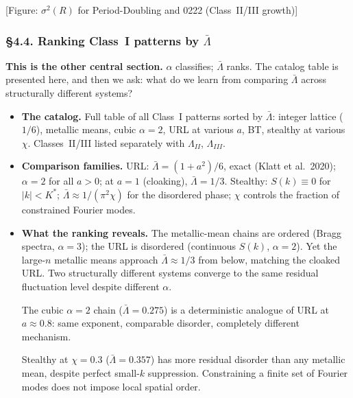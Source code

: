 \documentclass[11pt]{article}
\newcommand{\fig}[1]{{\color{figcolor}\textsf{[Figure: #1]}}}
\newcommand{\Lb}{\bar\Lambda}
\begin{document}
\fig{$\sigma^2(R)$ for Period-Doubling and 0222 (Class~II/III growth)}

\subsubsection{\S4.4. Ranking Class~I patterns by $\Lb$}

\textbf{This is the other central section.} $\alpha$ classifies;
$\Lb$ ranks. The catalog table is presented here, and then we ask:
what do we learn from comparing $\Lb$ across structurally different
systems?

\begin{itemize}[leftmargin=1.5em]
  \item \textbf{The catalog.}
        Full table of all Class~I patterns sorted by $\Lb$:
        integer lattice ($1/6$), metallic means, cubic $\alpha = 2$,
        URL at various $a$, BT, stealthy at various $\chi$.
        Classes~II/III listed separately with $\Lambda_{II}$,
        $\Lambda_{III}$.

  \item \textbf{Comparison families.}
        URL: $\Lb = (1+a^2)/6$, exact (Klatt et al.\ 2020);
        $\alpha = 2$ for all $a > 0$; at $a = 1$ (cloaking),
        $\Lb = 1/3$.
        Stealthy: $S(k) \equiv 0$ for $|k| < K^*$;
        $\Lb \approx 1/(\pi^2\chi)$ for the disordered phase;
        $\chi$ controls the fraction of constrained Fourier modes.

  \item \textbf{What the ranking reveals.}
        The metallic-mean chains are ordered (Bragg spectra,
        $\alpha = 3$); the URL is disordered (continuous $S(k)$,
        $\alpha = 2$). Yet the large-$n$ metallic means approach
        $\Lb \approx 1/3$ from below, matching the cloaked URL.
        Two structurally different systems converge to the same
        residual fluctuation level despite different $\alpha$.

        The cubic $\alpha = 2$ chain ($\Lb = 0.275$) is a
        deterministic analogue of URL at $a \approx 0.8$: same
        exponent, comparable disorder, completely different mechanism.

        Stealthy at $\chi = 0.3$ ($\Lb = 0.357$) has more residual
        disorder than any metallic mean, despite perfect
        small-$k$ suppression. Constraining a finite set of Fourier
        modes does not impose local spatial order.


\end{itemize}
\end{document}
